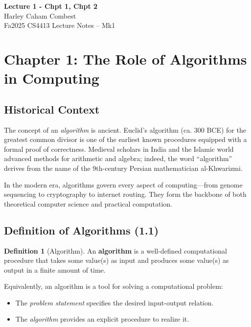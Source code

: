 \documentclass[12pt]{article}
\theoremstyle{definition}
\newtheorem{definition}{Definition}
\begin{document}
\begin{center}
\Large\textbf{Lecture 1 - Chpt 1, Chpt 2} \\
\large Harley Caham Combest \\
\large Fa2025 CS4413 Lecture Notes – Mk1
\end{center}

\vspace{1em}

\dotfill
\section*{Chapter 1: The Role of Algorithms in Computing}
\dotfill

\subsection*{Historical Context}
The concept of an \emph{algorithm} is ancient. Euclid’s algorithm (ca. 300 BCE) 
for the greatest common divisor is one of the earliest known procedures 
equipped with a formal proof of correctness. Medieval scholars in India and 
the Islamic world advanced methods for arithmetic and algebra; indeed, 
the word ``algorithm'' derives from the name of the 9th-century Persian 
mathematician al-Khwarizmi. 

In the modern era, algorithms govern every aspect of computing---from 
genome sequencing to cryptography to internet routing. They form the 
backbone of both theoretical computer science and practical computation.

\subsection*{Definition of Algorithms (1.1)}

\begin{definition}[Algorithm]
An \textbf{algorithm} is a well-defined computational procedure that takes some 
value(s) as input and produces some value(s) as output in a finite amount 
of time.
\end{definition}

Equivalently, an algorithm is a tool for solving a computational problem:
\begin{itemize}
    \item The \emph{problem statement} specifies the desired input-output relation.
    \item The \emph{algorithm} provides an explicit procedure to realize it.
\end{itemize}
\end{document}
